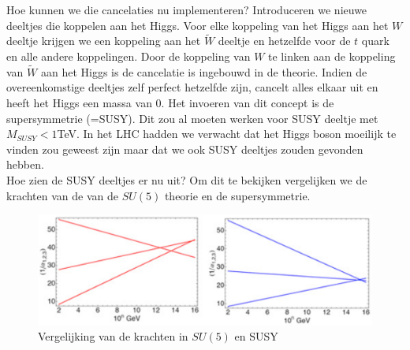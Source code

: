 \documentclass[../main.tex]{subfiles}
\begin{document}
Hoe kunnen we die cancelaties nu implementeren? Introduceren we nieuwe deeltjes die koppelen aan het Higgs. Voor elke koppeling van het Higgs aan het $W$ deeltje krijgen we een koppeling aan het $\tilde{W}$ deeltje en hetzelfde voor de $t$ quark en alle andere koppelingen. Door de koppeling van $W$ te linken aan de koppeling van $\tilde{W}$ aan het Higgs is de cancelatie is ingebouwd in de theorie. Indien de overeenkomstige deeltjes zelf perfect hetzelfde zijn, cancelt alles elkaar uit en heeft het Higgs een massa van 0. Het invoeren van dit concept is de supersymmetrie (=SUSY). Dit zou al moeten werken voor SUSY deeltje met $M_{SUSY}<1$TeV. In het LHC hadden we verwacht dat het Higgs boson moeilijk te vinden zou geweest zijn maar dat we ook SUSY deeltjes zouden gevonden hebben.\\
Hoe zien de SUSY deeltjes er nu uit? Om dit te bekijken vergelijken we de krachten van de van de $SU(5)$ theorie en de supersymmetrie.

\begin{figure}[h]
    \centering
    \includegraphics[width=0.5\linewidth]{physics_beyond_the_standard_model/su5_vs_susy.png}
    \caption{Vergelijking van de krachten in $SU(5)$ en SUSY}%
    \label{fig:physics_beyond_the_standard_model/su5_vs_susy}
\end{figure}
\end{document}
